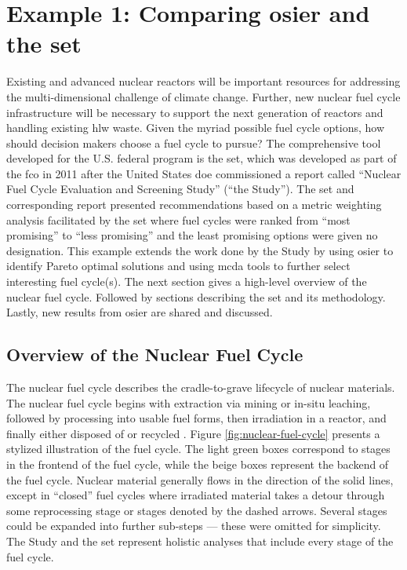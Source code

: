 
\section{Example 1: Comparing \ac{osier} and the \acs{set}}

Existing and advanced nuclear reactors will be important resources for
addressing the multi-dimensional challenge of climate change. Further, new
nuclear fuel cycle infrastructure will be necessary to support the next
generation of reactors and handling existing \ac{hlw} waste. Given the myriad
possible fuel cycle options, how should decision makers choose a fuel cycle to
pursue? The comprehensive tool developed for the U.S. federal program is the
\acf{set}, which was developed as part of the \ac{fco} in 2011 after the United
States \ac{doe} commissioned a report called ``Nuclear Fuel Cycle Evaluation and
Screening Study'' (``the Study'')\cite{wigeland_nuclear_2014-2}. The \ac{set}
and corresponding report presented recommendations based on a metric weighting
analysis facilitated by the \ac{set} where fuel cycles were ranked from ``most
promising'' to ``less promising'' and the least promising options were given no
designation. This example extends the work done by the Study by using \ac{osier}
to identify Pareto optimal solutions and using \ac{mcda} tools to further select
interesting fuel cycle(s). The next section gives a high-level overview of the
nuclear fuel cycle. Followed by sections describing the \ac{set} and its
methodology. Lastly, new results from \ac{osier} are shared and discussed.

\subsection{Overview of the Nuclear Fuel Cycle}

The nuclear fuel cycle describes the cradle-to-grave lifecycle of nuclear
materials. The nuclear fuel cycle begins with extraction via mining or in-situ
leaching, followed by processing into usable fuel forms, then irradiation in a
reactor, and finally either disposed of or recycled
\cite{tsoulfanidis_review_2013}. Figure \ref{fig:nuclear-fuel-cycle} presents a
stylized illustration of the fuel cycle. The light green boxes correspond to
stages in the frontend of the fuel cycle, while the beige boxes represent the
backend of the fuel cycle. Nuclear material generally flows in the direction of
the solid lines, except in ``closed'' fuel cycles where irradiated material
takes a detour through some reprocessing stage or stages denoted by the dashed
arrows. Several stages could be expanded into further sub-steps --- these were
omitted for simplicity. The Study and the \ac{set} represent holistic analyses
that include every stage of the fuel cycle.

